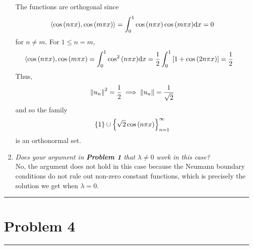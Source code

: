 \documentclass[fontsize=11pt]{article} %
\theoremstyle{plain}
\numberwithin{equation}{section} %
\numberwithin{figure}{section} %
\numberwithin{table}{section} %
\begin{document}
\begin{enumerate}[\bf (a)]
        The functions are orthogonal since
        \begin{align*}
            \langle \cos\qty(n\pi x), \cos\qty(m\pi x) \rangle = \int_0^1\cos\qty(n\pi x)\cos\qty(m \pi x)\dd x = 0
        \end{align*}
        for $n \neq m$.  For $1 \leq n = m$,
        \begin{align*}
            \langle \cos\qty(n\pi x), \cos\qty(m\pi x) &= \int_0^1\cos^2\qty(n\pi x)\dd x = \frac{1}{2}\int_0^1\qty[1 + \cos\qty(2n\pi x)] = \frac{1}{2}
        \end{align*}
        Thus,
        \begin{align*}
            \norm{u_n}^2 = \frac{1}{2} \implies \norm{u_n} = \frac{1}{\sqrt{2}}
        \end{align*}
        and so the family
        \begin{align*}
            \left\{1\right\}\cup\left\{\sqrt{2}\cos\qty(n\pi x)\right\}_{n=1}^\infty
        \end{align*}
        is an orthonormal set.
    \item
        \emph{Does your argument in \textbf{Problem 1} that $\lambda \neq 0$ work in this case?} \\

        No, the argument does not hold in this case because the Neumann boundary conditions do not rule out non-zero constant functions, which is precisely the solution we get when $\lambda = 0$.
\end{enumerate}

\begin{center}
    \noindent\rule{5cm}{1pt}
\end{center}
\section{\bf Problem 4}
\begin{center}
    \noindent\rule{5cm}{1pt}
\end{center}
\end{document}
